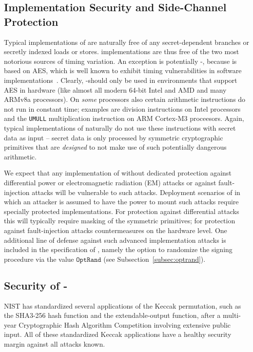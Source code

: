 \subsection{Implementation Security and Side-Channel Protection}

Typical implementations of \spx are naturally free of any secret-dependent
branches or secretly indexed loads or stores. \spx implementations are thus
free of the two most notorious sources of timing variation.
An exception is potentially \spx-\haraka, because \haraka is
based on AES, which is well known to exhibit timing vulnerabilities
in software implementations~\cite{Ber04,OST06,BM06,NS07}. Clearly, \spx-\haraka should
only be used in environments that support AES in hardware 
(like almost all modern 64-bit Intel and AMD and many ARMv8a processors).
On \emph{some} processors also certain arithmetic instructions do not
run in constant time; examples are division instructions on Intel processors
and the \verb_UMULL_ multiplication instruction on ARM Cortex-M3 proceesors.
Again, typical implementations of \spx naturally do not use these instructions
with secret data as input -- secret data is only processed 
by symmetric cryptographic primitives that are \emph{designed}
to not make use of such potentially dangerous arithmetic.

We expect that any implementation of \spx without dedicated protection
against differential power or electromagnetic radiation (EM) attacks 
or against fault-injection attacks will be vulnerable to such attacks. 
Deployment scenarios of \spx in which an attacker is assumed to have the power
to mount such attacks require specially protected implementations.
For protection against differential attacks this will typically require
masking of the symmetric primitives; 
for protection against fault-injection attacks countermeasures on the hardware level.
One additional line of defense against such advanced implementation attacks
is included in the specification of \spx, namely the option to randomize
the signing procedure via the value $\texttt{OptRand}$ 
(see Subsection~\ref{subsec:optrand}).


\subsection{Security of \spx-\shathree}
NIST has standardized several applications of the Keccak permutation,
such as the SHA3-256 hash function and the \shaketfs extendable-output function,
after a multi-year Cryptographic Hash Algorithm Competition
involving extensive public input.
All of these standardized Keccak applications
have a healthy security margin against all attacks known.

